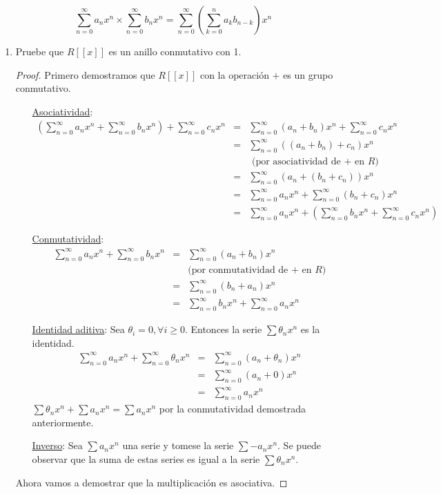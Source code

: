 \documentclass[letter,twoside,12pt]{article}
\begin{document}
\begin{equation}
\sum_{n=0}^{\infty}a_nx^n \times \sum_{n=0}^{\infty}b_nx^n = \sum_{n=0}^{\infty}(\sum_{k=0}^{n}a_kb_{n-k})x^n\nonumber
\nonumber
\end{equation}
\begin{enumerate}[label=\textbf{(\alph*)}]
\item Pruebe que $R[[x]]$ es un anillo conmutativo con 1.
\begin{proof}
Primero demostramos que $R[[x]]$ con la operaci\'on $+$ es un grupo conmutativo.
\begin{itemize}
\item[\underline{Asociatividad}:]
\begin{eqnarray}
(\sum_{n=0}^{\infty}a_nx^n + \sum_{n=0}^{\infty}b_nx^n) + \sum_{n=0}^{\infty}c_nx^n &=& \sum_{n=0}^{\infty}(a_n+b_n)x^n + \sum_{n=0}^{\infty}c_nx^n \nonumber
\\&=& \sum_{n=0}^{\infty}((a_n+b_n)+c_n)x^n\nonumber
\\& &\text{ (por asociatividad de + en $R$)}\nonumber
\\&=& \sum_{n=0}^{\infty}(a_n+(b_n+c_n))x^n\nonumber
\\&=& \sum_{n=0}^{\infty}a_nx^n + \sum_{n=0}^{\infty}(b_n+c_n)x^n \nonumber
\\&=& \sum_{n=0}^{\infty}a_nx^n + (\sum_{n=0}^{\infty}b_nx^n+  \sum_{n=0}^{\infty}c_nx^n) \nonumber
\end{eqnarray}
\item[\underline{Conmutatividad}:]
\begin{eqnarray}
\sum_{n=0}^{\infty}a_nx^n + \sum_{n=0}^{\infty}b_nx^n &=& \sum_{n=0}^{\infty}(a_n+b_n)x^n \nonumber
\\& & \text{(por conmutatividad de + en $R$)} \nonumber
\\&=& \sum_{n=0}^{\infty}(b_n+a_n)x^n \nonumber
\\&=& \sum_{n=0}^{\infty}b_nx^n+\sum_{n=0}^{\infty}a_nx^n  \nonumber
\end{eqnarray}
\item[\underline{Identidad aditiva}:]
Sea $\theta_i=0, \forall i \geq 0$. Entonces la serie $\sum \theta_nx^n$ es la identidad.
\begin{eqnarray}
\sum_{n=0}^{\infty}a_nx^n + \sum_{n=0}^{\infty}\theta_nx^n &=& \sum_{n=0}^{\infty}(a_n+\theta_n)x^n \nonumber
\\&=&\sum_{n=0}^{\infty}(a_n+0)x^n\nonumber
\\&=&\sum_{n=0}^{\infty}a_nx^n\nonumber
\end{eqnarray}
$\sum \theta_nx^n+\sum a_nx^n=\sum a_nx^n$ por la conmutatividad demostrada anteriormente.
\item[\underline{Inverso}:] Sea $\sum a_nx^n$ una serie y tomese la serie $\sum -a_nx^n$. Se puede observar que la suma de estas series es igual a la serie $\sum \theta_nx^n$.
\end{itemize}
Ahora vamos a demostrar que la multiplicaci\'on es asociativa.


\end{proof}
\end{enumerate}
\end{document}
